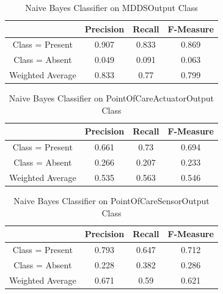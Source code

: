 \documentclass[11pt, notitlepage,abstracton,oneside]{article}   	%
\begin{document}
\begin{table}[H]
    \caption{Naive Bayes Classifier on MDDSOutput Class}
        \begin{center}
        \begin{tabular}{|c|c|c|c|}
            \hline
            & Precision & Recall & F-Measure \\ \hline
            Class = Present & 0.907 & 0.833 & 0.869 \\ \hline
            Class = Absent & 0.049 & 0.091 & 0.063 \\ \hline
            Weighted Average & 0.833 & 0.77 & 0.799 \\ \hline
        \end{tabular}
        \end{center}
    \label{default}
\end{table}%

\begin{table}[H]
    \caption{Naive Bayes Classifier on PointOfCareActuatorOutput Class}
        \begin{center}
        \begin{tabular}{|c|c|c|c|}
            \hline
            & Precision & Recall & F-Measure \\ \hline
            Class = Present & 0.661 & 0.73 & 0.694 \\ \hline
            Class = Absent & 0.266 & 0.207 & 0.233 \\ \hline
            Weighted Average & 0.535 & 0.563 & 0.546 \\ \hline
        \end{tabular}
        \end{center}
    \label{default}
\end{table}%

\begin{table}[H]
    \caption{Naive Bayes Classifier on PointOfCareSensorOutput Class}
        \begin{center}
        \begin{tabular}{|c|c|c|c|}
            \hline
            & Precision & Recall & F-Measure \\ \hline
            Class = Present & 0.793 & 0.647 & 0.712 \\ \hline
            Class = Absent & 0.228 & 0.382 & 0.286 \\ \hline
            Weighted Average & 0.671 & 0.59 & 0.621 \\ \hline
        \end{tabular}
        \end{center}
    \label{default}
\end{table}%
\end{document}
